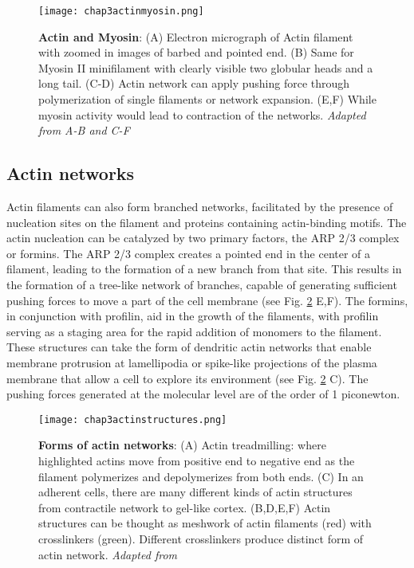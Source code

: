 \begin{figure} []
	\centering
	\texttt{[image: chap3actinmyosin.png]}
	\caption{\label{fig_3_1} \textbf{Actin and Myosin}: (A) Electron micrograph of Actin filament with zoomed in images of barbed and pointed end. (B) Same for Myosin II minifilament with clearly visible two globular heads and a long tail. (C-D) Actin network can apply pushing force through polymerization of single filaments or network expansion. (E,F) While myosin activity would lead to contraction of the networks. \textit{Adapted from A-B \cite{alberts2015} and C-F \cite{clarke2021}}
	}
\end{figure}

\hypertarget{actin-networks}{%
	\subsection{Actin networks}\label{actin-networks}}

Actin filaments can also form branched networks, facilitated by the presence of nucleation sites on the filament and proteins containing actin-binding motifs. The actin nucleation can be catalyzed by two primary factors, the ARP 2/3 complex or formins. The ARP 2/3 complex creates a pointed end in the center of a filament, leading to the formation of a new branch from that site. This results in the formation of a tree-like network of branches, capable of generating sufficient pushing forces to move a part of the cell membrane (see Fig. \ref{fig_3_2} E,F). The formins, in conjunction with profilin, aid in the growth of the filaments, with profilin serving as a staging area for the rapid addition of monomers to the filament. These structures can take the form of dendritic actin networks that enable membrane protrusion at lamellipodia or spike-like projections of the plasma membrane that allow a cell to explore its environment (see Fig. \ref{fig_3_2} C). The pushing forces generated at the molecular level are of the order of 1 piconewton.


\begin{figure}[h!]
	\centering
	\texttt{[image: chap3actinstructures.png]}
	\caption{\label{fig_3_2} \textbf{Forms of actin networks}: (A) Actin treadmilling: where highlighted actins move from positive end to negative end as the filament polymerizes and depolymerizes from both ends. (C) In an adherent cells, there are many different kinds of actin structures from contractile network to gel-like cortex. (B,D,E,F) Actin structures can be thought as meshwork of actin filaments (red) with crosslinkers (green). Different crosslinkers produce distinct form of actin network.  \textit{Adapted from \cite{alberts2015}}
	}
\end{figure}

